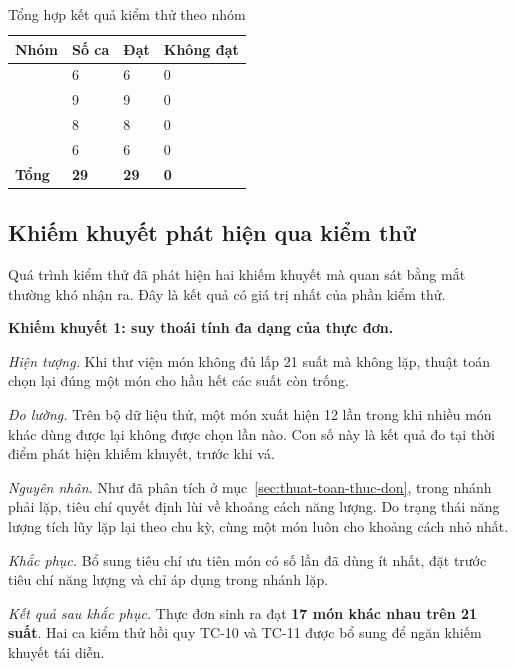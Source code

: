 \begin{table}[H]
\centering
\caption{Tổng hợp kết quả kiểm thử theo nhóm}
\label{tab:tong-hop-kiem-thu}
\begin{tabularx}{\textwidth}{|Y|P{2.0cm}|P{2.0cm}|P{2.4cm}|}
\hline
\bfseries Nhóm & \bfseries Số ca & \bfseries Đạt & \bfseries Không đạt \\ \hline
{} & 6 & 6 & 0 \\ \hline
{} & 9 & 9 & 0 \\ \hline
{} & 8 & 8 & 0 \\ \hline
{} & 6 & 6 & 0 \\ \hline
\bfseries Tổng & \bfseries 29 & \bfseries 29 & \bfseries 0 \\ \hline
\end{tabularx}
\end{table}

\subsection{Khiếm khuyết phát hiện qua kiểm thử}
\label{sec:khiem-khuyet}

Quá trình kiểm thử đã phát hiện hai khiếm khuyết mà quan sát bằng mắt thường khó
nhận ra. Đây là kết quả có giá trị nhất của phần kiểm thử.

\noindent\textbf{Khiếm khuyết 1: suy thoái tính đa dạng của thực đơn.}

\textit{Hiện tượng.} Khi thư viện món không đủ lấp 21 suất mà không lặp, thuật
toán chọn lại đúng một món cho hầu hết các suất còn trống.

\textit{Đo lường.} Trên bộ dữ liệu thử, một món xuất hiện 12 lần trong khi nhiều
món khác dùng được lại không được chọn lần nào. Con số này là kết quả đo tại thời
điểm phát hiện khiếm khuyết, trước khi vá.

\textit{Nguyên nhân.} Như đã phân tích ở mục~\ref{sec:thuat-toan-thuc-don}, trong
nhánh phải lặp, tiêu chí quyết định lùi về khoảng cách năng lượng. Do trạng thái
năng lượng tích lũy lặp lại theo chu kỳ, cùng một món luôn cho khoảng cách nhỏ
nhất.

\textit{Khắc phục.} Bổ sung tiêu chí ưu tiên món có số lần đã dùng ít nhất, đặt
trước tiêu chí năng lượng và chỉ áp dụng trong nhánh lặp.

\textit{Kết quả sau khắc phục.} Thực đơn sinh ra đạt \textbf{17 món khác nhau
trên 21 suất}. Hai ca kiểm thử hồi quy TC-10 và TC-11 được bổ sung để ngăn khiếm
khuyết tái diễn.

